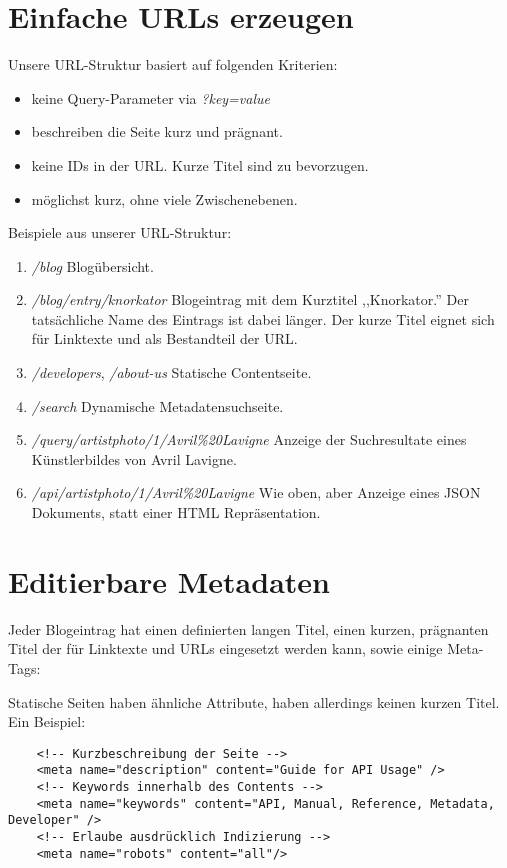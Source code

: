 \section{Einfache URLs erzeugen}
Unsere URL-Struktur basiert auf folgenden Kriterien:
\begin{itemize}
\item keine Query-Parameter via \emph{?key=value}
\item beschreiben die Seite kurz und prägnant.
\item keine IDs in der URL. Kurze Titel sind zu bevorzugen.
\item möglichst kurz, ohne viele Zwischenebenen.
\end{itemize}


Beispiele aus unserer URL-Struktur:
\begin{enumerate}
    \item \emph{/blog} Blogübersicht.
    \item \emph{/blog/entry/knorkator} Blogeintrag mit dem Kurztitel ,,Knorkator.''
          Der tatsächliche Name des Eintrags ist dabei länger. Der kurze Titel
          eignet sich für Linktexte und als Bestandteil der URL.
    \item \emph{/developers}, \emph{/about-us} Statische Contentseite.
    \item \emph{/search} Dynamische Metadatensuchseite.
    \item \emph{/query/artistphoto/1/Avril\%20Lavigne} Anzeige der Suchresultate
    eines Künstlerbildes von Avril Lavigne.
    \item \emph{/api/artistphoto/1/Avril\%20Lavigne} Wie oben, aber Anzeige
    eines JSON Dokuments, statt einer HTML Repräsentation.
\end{enumerate}

\section{Editierbare Metadaten}
Jeder Blogeintrag hat einen definierten langen Titel, einen kurzen, prägnanten
Titel der für Linktexte und URLs eingesetzt werden kann, sowie einige Meta-Tags:


Statische Seiten haben ähnliche Attribute, haben allerdings keinen kurzen Titel.
Ein Beispiel:

\begin{verbatim}
    <!-- Kurzbeschreibung der Seite -->
    <meta name="description" content="Guide for API Usage" />
    <!-- Keywords innerhalb des Contents -->
    <meta name="keywords" content="API, Manual, Reference, Metadata, Developer" />
    <!-- Erlaube ausdrücklich Indizierung -->
    <meta name="robots" content="all"/>
\end{verbatim}
